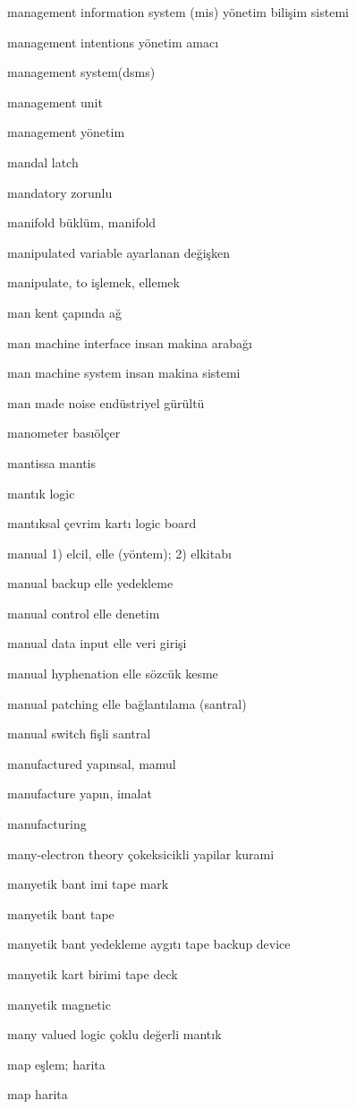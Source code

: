 \documentclass[12pt,fleqn]{article}\usepackage{../../common}
\begin{document}
management information system (mis) yönetim bilişim sistemi

management intentions yönetim amacı

management system(dsms)

management unit

management yönetim

mandal latch

mandatory zorunlu

manifold büklüm, manifold

manipulated variable ayarlanan değişken

manipulate, to işlemek, ellemek

man kent çapında ağ

man machine interface insan makina arabağı

man machine system insan makina sistemi

man made noise endüstriyel gürültü

manometer basıölçer

mantissa mantis

mantık logic

mantıksal çevrim kartı logic board

manual 1) elcil, elle (yöntem); 2) elkitabı

manual backup elle yedekleme

manual control elle denetim

manual data input elle veri girişi

manual hyphenation elle sözcük kesme

manual patching elle bağlantılama (santral)

manual switch fişli santral

manufactured yapınsal, mamul

manufacture yapın, imalat

manufacturing

many-electron theory çokeksicikli yapilar kurami

manyetik bant imi tape mark

manyetik bant tape

manyetik bant yedekleme aygıtı tape backup device

manyetik kart birimi tape deck

manyetik magnetic

many valued logic çoklu değerli mantık

map eşlem; harita

map harita
\end{document}
